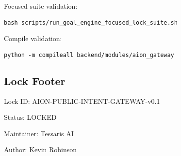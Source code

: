 Focused suite validation:

\begin{verbatim}
bash scripts/run_goal_engine_focused_lock_suite.sh
\end{verbatim}

Compile validation:

\begin{verbatim}
python -m compileall backend/modules/aion_gateway
\end{verbatim}

\subsection{Lock Footer}

Lock ID: AION-PUBLIC-INTENT-GATEWAY-v0.1

Status: LOCKED

Maintainer: Tessaris AI

Author: Kevin Robinson
